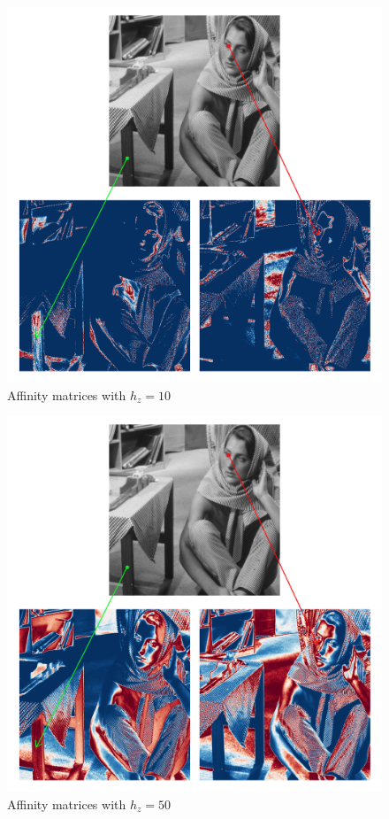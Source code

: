 \begin{description}[align=left]
  \begin{figure}[H]
      \centering
      \includegraphics[width=\textwidth]{img/photometricAffinitySigma10.png}
      \caption{Affinity matrices with \(h_z = 10\)}
  \end{figure}

  \begin{figure}[H]
      \centering
      \includegraphics[width=\textwidth]{img/photometricAffinitySigma50.png}
      \caption{Affinity matrices with \(h_z = 50\)}
  \end{figure}


\end{description}
